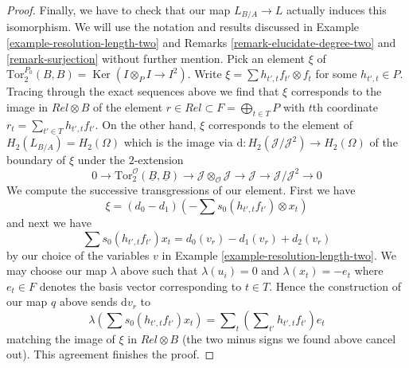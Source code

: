 \documentclass[10pt,a4paper]{article}
\theoremstyle{plain}
\theoremstyle{definition}
\theoremstyle{remark}
\numberwithin{equation}{subsection}
\def\Ker{\mathop{\mathrm{Ker}}}
\begin{document}
\begin{proof}
\medskip\noindent
Finally, we have to check that our map $L_{B/A} \to L$ actually induces
this isomorphism. We will use the notation and results discussed in
Example \ref{example-resolution-length-two} and
Remarks \ref{remark-elucidate-degree-two} and \ref{remark-surjection}
without further mention. Pick an element $\xi$ of
$\text{Tor}_2^{P_0}(B, B) = \Ker(I \otimes_P I \to I^2)$.
Write $\xi = \sum h_{t', t}f_{t'} \otimes f_t$ for some
$h_{t', t} \in P$. Tracing through the exact sequences above we
find that $\xi$ corresponds to the image in $Rel \otimes B$
of the element $r \in Rel \subset F = \bigoplus_{t \in T} P$ with
$t$th coordinate $r_t = \sum_{t' \in T} h_{t', t}f_{t'}$.
On the other hand, $\xi$ corresponds to the element of
$H_2(L_{B/A}) = H_2(\Omega)$ which is the image
via $\text{d} : H_2(\mathcal{J}/\mathcal{J}^2) \to H_2(\Omega)$
of the boundary of $\xi$ under the $2$-extension
$$
0 \to
\text{Tor}_2^\mathcal{O}(\underline{B}, \underline{B})
\to 
\mathcal{J} \otimes_\mathcal{O} \mathcal{J} \to \mathcal{J}
\to
\mathcal{J}/\mathcal{J}^2 \to 0
$$
We compute the successive transgressions of our element. First we have
$$
\xi = (d_0 - d_1)(- \sum s_0(h_{t', t} f_{t'}) \otimes x_t)
$$
and next we have
$$
\sum s_0(h_{t', t} f_{t'}) x_t = d_0(v_r) - d_1(v_r) + d_2(v_r)
$$
by our choice of the variables $v$ in
Example \ref{example-resolution-length-two}.
We may choose our map $\lambda$ above such that
$\lambda(u_i) = 0$ and $\lambda(x_t) = - e_t$ where $e_t \in F$
denotes the basis vector corresponding to $t \in T$.
Hence the construction of our map $q$ above sends $\text{d}v_r$ to
$$
\lambda(\sum s_0(h_{t', t} f_{t'}) x_t) =
\sum\nolimits_t \left(\sum\nolimits_{t'} h_{t', t}f_{t'}\right) e_t
$$
matching the image of $\xi$ in $Rel \otimes B$ (the two minus signs
we found above cancel out). This agreement finishes the proof.
\end{proof}
\end{document}
